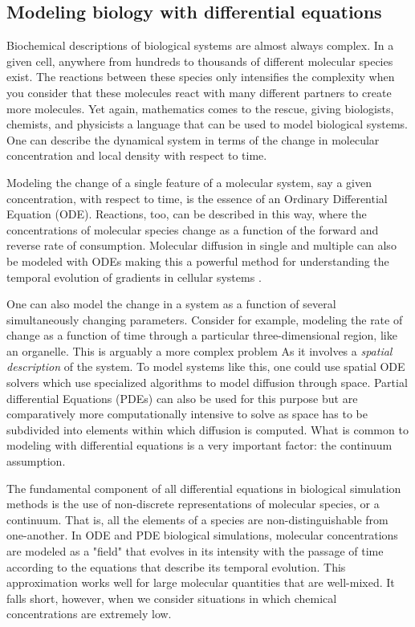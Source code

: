 \documentclass[12pt]{ucsddissertation}
\begin{document}
\begin{dissertationintroduction}
\subsection{Modeling biology with differential equations}
Biochemical descriptions of biological systems are almost always complex. In a given cell, anywhere from hundreds to thousands of different molecular species exist. The reactions between these species only intensifies the complexity when you consider that these molecules react with many different partners to create more molecules. Yet again, mathematics comes to the rescue, giving biologists, chemists, and physicists a language that can be used to model biological systems. One can describe the dynamical system in terms of the change in molecular concentration and local density with respect to time. 

Modeling the change of a single feature of a molecular system, say a given concentration, with respect to time, is the essence of an Ordinary Differential Equation (ODE). Reactions, too, can be described in this way, where the concentrations of molecular species change as a function of the forward and reverse rate of consumption. Molecular diffusion in single and multiple can also be modeled with ODEs making this a powerful method for understanding the temporal evolution of gradients in cellular systems \cite{Faeder2009}.

One can also model the change in a system as a function of several simultaneously changing parameters. Consider for example, modeling the rate of change as a function of time through a particular three-dimensional region, like an organelle. This is arguably a more complex problem As it involves a \textit{spatial description} of the system. To model systems like this, one could use spatial ODE solvers \cite{Harrison2016} which use specialized algorithms to model diffusion through space. Partial differential Equations (PDEs) can also be used for this purpose but are comparatively more computationally intensive to solve as space has to be subdivided into elements within which diffusion is computed. What is common to modeling with differential equations is a very important factor: the continuum assumption.

The fundamental component of all differential equations in biological simulation methods is the use of non-discrete representations of molecular species, or a continuum. That is, all the elements of a species are non-distinguishable from one-another. In ODE and PDE biological simulations, molecular concentrations are modeled as a "field" that evolves in its intensity with the passage of time according to the equations that describe its temporal evolution. This approximation works well for large molecular quantities that are well-mixed. It falls short, however, when we consider situations in which chemical concentrations are extremely low.


\end{dissertationintroduction}
\end{document}
